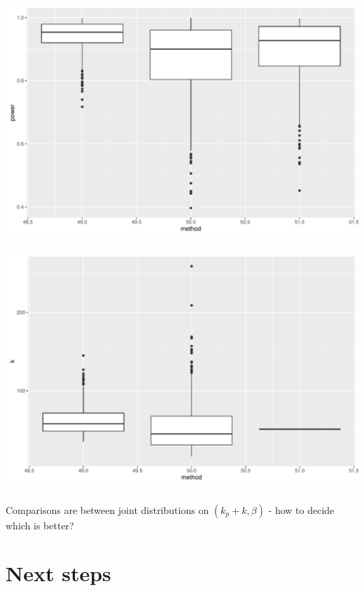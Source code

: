 \documentclass{beamer}
\begin{document}
\begin{frame}
\frametitle{}
\includegraphics[scale=0.5]{./power_box}
\end{frame}

\begin{frame}
\frametitle{}
\includegraphics[scale=0.5]{./k_box}
\end{frame}

\begin{frame}
\frametitle{}
Comparisons are between joint distributions on $(k_{p} + k, \beta)$ - how to decide which is better?
\end{frame}

\section{Next steps}
\end{document}
